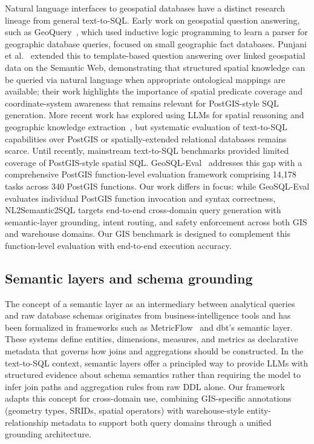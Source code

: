 \documentclass[11pt]{article}
\begin{document}
Natural language interfaces to geospatial databases have a distinct research lineage from general text-to-SQL. Early work on geospatial question answering, such as GeoQuery~\cite{zelle1996geoquery}, which used inductive logic programming to learn a parser for geographic database queries, focused on small geographic fact databases. Punjani et al.~\cite{punjani2018geospatial} extended this to template-based question answering over linked geospatial data on the Semantic Web, demonstrating that structured spatial knowledge can be queried via natural language when appropriate ontological mappings are available; their work highlights the importance of spatial predicate coverage and coordinate-system awareness that remains relevant for PostGIS-style SQL generation. More recent work has explored using LLMs for spatial reasoning and geographic knowledge extraction~\cite{mai2024foundation}, but systematic evaluation of text-to-SQL capabilities over PostGIS or spatially-extended relational databases remains scarce. Until recently, mainstream text-to-SQL benchmarks provided limited coverage of PostGIS-style spatial SQL. GeoSQL-Eval~\cite{hou2025geosql} addresses this gap with a comprehensive PostGIS function-level evaluation framework comprising 14,178 tasks across 340 PostGIS functions. Our work differs in focus: while GeoSQL-Eval evaluates individual PostGIS function invocation and syntax correctness, NL2Semantic2SQL targets end-to-end cross-domain query generation with semantic-layer grounding, intent routing, and safety enforcement across both GIS and warehouse domains. Our GIS benchmark is designed to complement this function-level evaluation with end-to-end execution accuracy.

\subsection{Semantic layers and schema grounding}

The concept of a semantic layer as an intermediary between analytical queries and raw database schemas originates from business-intelligence tools and has been formalized in frameworks such as MetricFlow~\cite{metricflow} and dbt's semantic layer. These systems define entities, dimensions, measures, and metrics as declarative metadata that governs how joins and aggregations should be constructed. In the text-to-SQL context, semantic layers offer a principled way to provide LLMs with structured evidence about schema semantics rather than requiring the model to infer join paths and aggregation rules from raw DDL alone. Our framework adapts this concept for cross-domain use, combining GIS-specific annotations (geometry types, SRIDs, spatial operators) with warehouse-style entity-relationship metadata to support both query domains through a unified grounding architecture.
\end{document}

